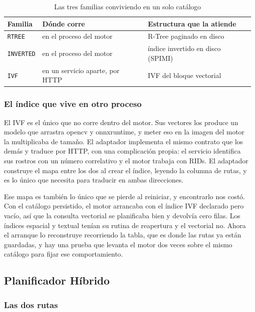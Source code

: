 \documentclass[a4paper,12pt]{article}
\begin{document}
\begin{table}[H]
\centering
\caption{Las tres familias conviviendo en un solo catálogo}
\begin{tabularx}{\textwidth}{@{}llX@{}}
\toprule
\textbf{Familia} & \textbf{Dónde corre} & \textbf{Estructura que la atiende} \\
\midrule
\texttt{RTREE} & en el proceso del motor & R-Tree paginado en disco \\
\texttt{INVERTED} & en el proceso del motor & índice invertido en disco (SPIMI) \\
\texttt{IVF} & en un servicio aparte, por HTTP & IVF del bloque vectorial \\
\bottomrule
\end{tabularx}
\end{table}

\subsubsection{El índice que vive en otro proceso}

El IVF es el único que no corre dentro del motor. Sus vectores los produce un
modelo que arrastra opencv y onnxruntime, y meter eso en la imagen del motor la
multiplicaba de tamaño. El adaptador implementa el mismo contrato que los demás
y traduce por HTTP, con una complicación propia: el servicio identifica sus
rostros con un número correlativo y el motor trabaja con RIDs. El adaptador
construye el mapa entre los dos al crear el índice, leyendo la columna de rutas,
y es lo único que necesita para traducir en ambas direcciones.

Ese mapa es también lo único que se pierde al reiniciar, y encontrarlo nos costó.
Con el catálogo persistido, el motor arrancaba con el índice IVF declarado pero
vacío, así que la consulta vectorial se planificaba bien y devolvía cero filas.
Los índices espacial y textual tenían su rutina de reapertura y el vectorial no.
Ahora el arranque lo reconstruye recorriendo la tabla, que es donde las rutas ya
están guardadas, y hay una prueba que levanta el motor dos veces sobre el mismo
catálogo para fijar ese comportamiento.

\subsection{Planificador Híbrido}

\subsubsection{Las dos rutas}
\end{document}
